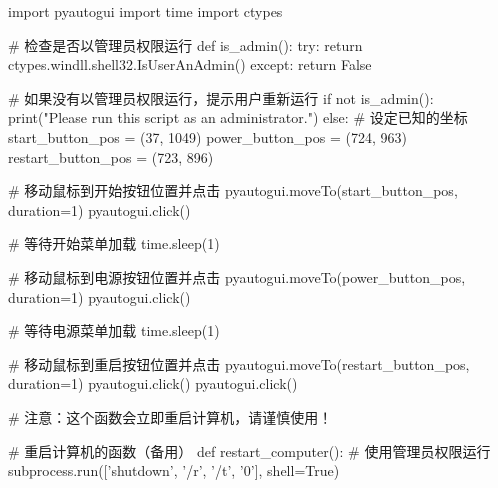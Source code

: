 import pyautogui
import time
import ctypes

# 检查是否以管理员权限运行
def is_admin():
try:
return ctypes.windll.shell32.IsUserAnAdmin()
except:
return False

# 如果没有以管理员权限运行，提示用户重新运行
if not is_admin():
print("Please run this script as an administrator.")
else:
# 设定已知的坐标
start_button_pos = (37, 1049)
power_button_pos = (724, 963)
restart_button_pos = (723, 896)

# 移动鼠标到开始按钮位置并点击
pyautogui.moveTo(start_button_pos, duration=1)
pyautogui.click()

# 等待开始菜单加载
time.sleep(1)

# 移动鼠标到电源按钮位置并点击
pyautogui.moveTo(power_button_pos, duration=1)
pyautogui.click()

# 等待电源菜单加载
time.sleep(1)

# 移动鼠标到重启按钮位置并点击
pyautogui.moveTo(restart_button_pos, duration=1)
pyautogui.click()
pyautogui.click()

# 注意：这个函数会立即重启计算机，请谨慎使用！

# 重启计算机的函数（备用）
def restart_computer():
# 使用管理员权限运行
subprocess.run(['shutdown', '/r', '/t', '0'], shell=True)
